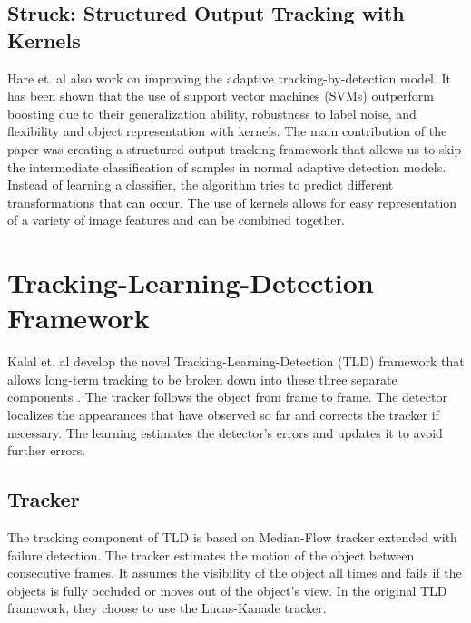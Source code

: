 \documentclass[10pt,twocolumn,letterpaper]{article}
\begin{document}
\subsection{Struck: Structured Output Tracking with Kernels}
Hare et. al also work on improving the adaptive tracking-by-detection model.  \cite{kernel} It has been shown that the use of support vector machines (SVMs) outperform boosting due to their generalization ability, robustness to label noise, and flexibility and object representation with kernels. The main contribution of the paper was creating a structured output tracking framework that allows us to skip the intermediate classification of samples in normal adaptive detection models. Instead of learning a classifier, the algorithm tries to predict different transformations that can occur. The use of kernels allows for easy representation of a variety of image features and can be combined together.

\section{Tracking-Learning-Detection Framework}
Kalal et. al develop the novel Tracking-Learning-Detection (TLD) framework that allows long-term tracking to be broken down into these three separate components \cite{tld}. The tracker follows the object from frame to frame. The detector localizes the appearances that have observed so far and corrects the tracker if necessary. The learning estimates the detector's errors and updates it to avoid further errors.
\subsection{Tracker}
The tracking component of TLD is based on Median-Flow tracker extended with failure detection. The tracker estimates the motion of the object between consecutive frames. It assumes the visibility of the object all times and fails if the objects is fully occluded or moves out of the object's view. In the original TLD framework, they choose to use the Lucas-Kanade tracker. 
\end{document}

